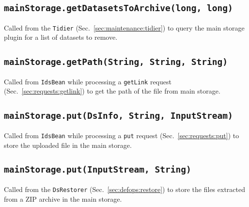 \documentclass[paper=a4]{scrartcl}
\begin{document}
\subsection{\texttt{mainStorage.getDatasetsToArchive(long, long)}}

Called from the \texttt{Tidier} (Sec.~\ref{sec:maintenance:tidier}) to
query the main storage plugin for a list of datasets to remove.

\subsection{\texttt{mainStorage.getPath(String, String, String)}}

Called from \texttt{IdsBean} while processing a \texttt{getLink}
request (Sec.~\ref{sec:requests:getlink}) to get the path of the file
from main storage.

\subsection{\texttt{mainStorage.put(DsInfo, String, InputStream)}}

Called from \texttt{IdsBean} while processing a \texttt{put} request
(Sec.~\ref{sec:requests:put}) to store the uploaded file in the main
storage.

\subsection{\texttt{mainStorage.put(InputStream, String)}}

Called from the \texttt{DsRestorer} (Sec.~\ref{sec:defops:restore})
to store the files extracted from a ZIP archive in the main storage.
\end{document}
